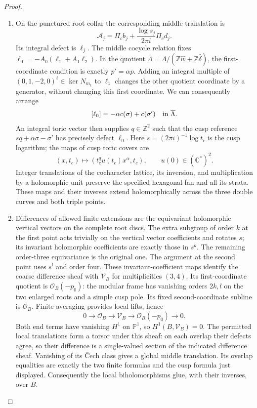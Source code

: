 \begin{proof}
\begin{enumerate}[label=\arabic*.,leftmargin=*]
\item On the punctured root collar the corresponding middle translation is
\[
 \mathcal A_j=\Pi_cb_j+\frac{\log s_j}{2\pi i}\Pi_cd_j.
\]
Its integral defect is $\ell_j$.  The middle cocycle relation fixes
$\ell_0=-A_0(\ell_1+A_1\ell_2)$.  In the quotient
$\overline\Lambda=\Lambda/(\mathbb Z\widehat w+\mathbb Z\widehat\delta)$,
the first-coordinate condition is exactly $p'=\alpha p$.
Adding an integral multiple of $(0,1,-2,0)^t\in\ker N_{m_1}$ to
$\ell_1$ changes the other quotient coordinate by a generator,
without changing this first coordinate.  We can consequently arrange
\[
 [\ell_0]=-\alpha c(\sigma)+c(\sigma')\quad\hbox{in }\overline\Lambda.
\]
An integral toric vector then supplies $q\in\mathbb Z^2$ such that
the cusp reference $sq+\alpha\sigma-\sigma'$ has precisely defect
$\ell_0$.  Here $s=(2\pi i)^{-1}\log t_c$ is the cusp logarithm;
the maps of cusp toric covers are
\[
 (x,t_c)\longmapsto(t_c^q u(t_c)x^\alpha,t_c),
 \qquad u(0)\in(\mathbb C^*)^2.
\]
Integer translations of the cocharacter lattice, its inversion,
and multiplication by a holomorphic unit preserve the specified
hexagonal fan and all its strata.  These maps and their inverses
extend holomorphically across the three double curves and both
triple points.

\item Differences of allowed
finite extensions are the equivariant holomorphic vertical vectors
on the complete root discs.  The extra subgroup of order $k$ at
the first point acts trivially on the vertical vector coefficients
and rotates $s$; its invariant holomorphic coefficients are exactly
those in $s^k$.  The remaining order-three equivariance is the
original one.  The argument at the second point uses $s^l$ and
order four.  These invariant-coefficient maps identify the coarse difference sheaf
with $\mathcal V_B$ for multiplicities $(3,4)$.  Its first-coordinate quotient is
$\mathcal O_B(-p_0)$: the modular frame has vanishing orders $2k,l$
on the two enlarged roots and a simple cusp pole.  Its fixed
second-coordinate subline is $\mathcal O_B$.  Finite averaging
provides local lifts, hence
\[
 0\longrightarrow\mathcal O_B\longrightarrow\mathcal V_B
 \longrightarrow\mathcal O_B(-p_0)\longrightarrow0.
\]
Both end terms have vanishing $H^1$ on $\mathbb P^1$, so
$H^1(B,\mathcal V_B)=0$.  The permitted local translations form a
torsor under this sheaf: on each overlap their defects agree, so
their difference is a single-valued section of the indicated
difference sheaf.  Vanishing of its \v Cech class gives a global
middle translation.  Its overlap equalities are exactly the two
finite formulas and the cusp formula just displayed.  Consequently
the local biholomorphisms glue, with their inverses, over $B$.


\end{enumerate}
\end{proof}
